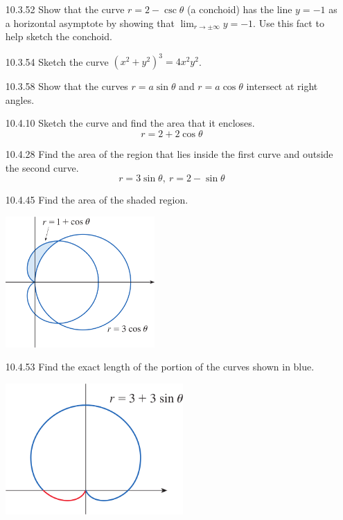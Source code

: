\documentclass{article}
\begin{document}
\begin{enumerate}
\item[10.3.52]
    Show that the curve $r=2- \csc\theta$ (a conchoid)  has the line $y=-1$
    as a horizontal asymptote by showing that
    $\displaystyle \lim_{r \longrightarrow \pm \infty} y = -1$. Use this fact to help
    sketch the conchoid.

\vspace{6cm}

\item[10.3.54]
    Sketch the curve $(x^{2}+y^{2})^{3}=4x^{2}y^{2}$.

\vspace{6cm}

\item[10.3.58]
    Show that the curves $r=a \sin\theta$ and $r = a \cos\theta$
    intersect at right angles.

\newpage

\item[10.4.10]
    Sketch the curve and find the area that it encloses.
    \[
        r = 2 + 2 \cos\theta
    \]

\vspace{8cm}

\item[10.4.28]
    Find the area of the region that lies inside the first curve
    and outside the second curve.
    \[
        r = 3\sin\theta,\ r = 2 - \sin\theta
    \]

\newpage

\item[10.4.45]
    Find the area of the shaded region.
    \begin{center}
        \includegraphics[height=5cm]{./png/10.4.45.png}
    \end{center}

\vspace{6cm}

\item[10.4.53]
    Find the exact length of the portion of the curves shown
    in blue.
    \begin{center}
        \includegraphics[height=5cm]{./png/10.4.53.png}
    \end{center}


\end{enumerate}
\end{document}
